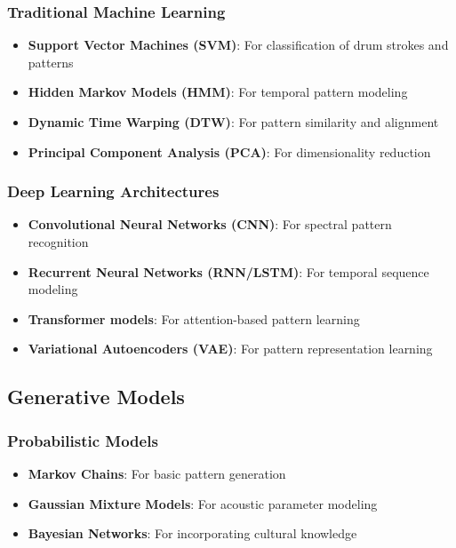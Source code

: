 \documentclass[12pt]{article}
\begin{document}
\subsubsection{Traditional Machine Learning}
\begin{itemize}
    \item \textbf{Support Vector Machines (SVM)}: For classification of drum strokes and patterns
    \item \textbf{Hidden Markov Models (HMM)}: For temporal pattern modeling
    \item \textbf{Dynamic Time Warping (DTW)}: For pattern similarity and alignment
    \item \textbf{Principal Component Analysis (PCA)}: For dimensionality reduction
\end{itemize}

\subsubsection{Deep Learning Architectures}
\begin{itemize}
    \item \textbf{Convolutional Neural Networks (CNN)}: For spectral pattern recognition
    \item \textbf{Recurrent Neural Networks (RNN/LSTM)}: For temporal sequence modeling
    \item \textbf{Transformer models}: For attention-based pattern learning
    \item \textbf{Variational Autoencoders (VAE)}: For pattern representation learning
\end{itemize}

\subsection{Generative Models}

\subsubsection{Probabilistic Models}
\begin{itemize}
    \item \textbf{Markov Chains}: For basic pattern generation
    \item \textbf{Gaussian Mixture Models}: For acoustic parameter modeling
    \item \textbf{Bayesian Networks}: For incorporating cultural knowledge
\end{itemize}
\end{document}
